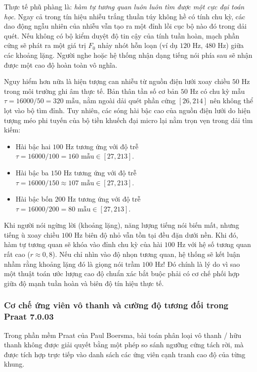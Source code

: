 Thực tế phũ phàng là: \emph{hàm tự tương quan luôn luôn tìm được một cực đại toán học}. Ngay cả trong tín hiệu nhiễu trắng thuần túy không hề có tính chu kỳ, các dao động ngẫu nhiên của nhiễu vẫn tạo ra một đỉnh lồi cục bộ nào đó trong dải quét. Nếu không có bộ kiểm duyệt độ tin cậy của tính tuần hoàn, mạch phần cứng sẽ phát ra một giá trị $F_0$ nhảy nhót hỗn loạn (ví dụ $120\text{ Hz}$, $480\text{ Hz}$) giữa các khoảng lặng. Người nghe hoặc hệ thống nhận dạng tiếng nói phía sau sẽ nhận được một cao độ hoàn toàn vô nghĩa.

Nguy hiểm hơn nữa là hiện tượng can nhiễu từ nguồn điện lưới xoay chiều $50\text{ Hz}$ trong môi trường ghi âm thực tế. Bản thân tần số cơ bản $50\text{ Hz}$ có chu kỳ mẫu $\tau = 16000 / 50 = 320\text{ mẫu}$, nằm ngoài dải quét phần cứng $[26, 214]$ nên không thể lọt vào bộ tìm đỉnh. Tuy nhiên, các sóng hài bậc cao của nguồn điện lưới do hiện tượng méo phi tuyến của bộ tiền khuếch đại micro lại nằm trọn vẹn trong dải tìm kiếm:
\begin{itemize}
    \item Hài bậc hai $100\text{ Hz}$ tương ứng với độ trễ $\tau = 16000 / 100 = 160\text{ mẫu} \in [27, 213]$.
    \item Hài bậc ba $150\text{ Hz}$ tương ứng với độ trễ $\tau = 16000 / 150 \approx 107\text{ mẫu} \in [27, 213]$.
    \item Hài bậc bốn $200\text{ Hz}$ tương ứng với độ trễ $\tau = 16000 / 200 = 80\text{ mẫu} \in [27, 213]$.
\end{itemize}
Khi người nói ngừng lời (khoảng lặng), năng lượng tiếng nói biến mất, nhưng tiếng ù xoay chiều $100\text{ Hz}$ biên độ nhỏ vẫn tồn tại đều đặn dưới nền. Khi đó, hàm tự tương quan sẽ khóa vào đỉnh chu kỳ của hài $100\text{ Hz}$ với hệ số tương quan rất cao ($r \approx 0{,}8$). Nếu chỉ nhìn vào độ nhọn tương quan, hệ thống sẽ kết luận nhầm rằng khoảng lặng đó là giọng nói trầm $100\text{ Hz}$! Đó chính là lý do vì sao một thuật toán ước lượng cao độ chuẩn xác bắt buộc phải có cơ chế phối hợp giữa độ mạnh tuần hoàn và biên độ tín hiệu thực tế.

\subsubsection*{Cơ chế ứng viên vô thanh và cường độ tương đối trong Praat 7.0.03}
Trong phần mềm Praat của Paul Boersma, bài toán phân loại vô thanh / hữu thanh không được giải quyết bằng một phép so sánh ngưỡng cứng tách rời, mà được tích hợp trực tiếp vào danh sách các ứng viên cạnh tranh cao độ của từng khung.

